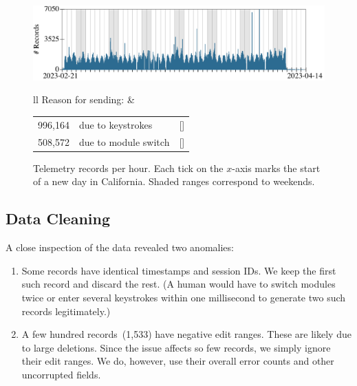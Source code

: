 \documentclass[english,submission,cleveref]{programming}
\begin{document}
\begin{figure}[t]\centering
  \includegraphics[width=\columnwidth]{img/row-distribution.pdf}
  \begin{tabular}{ll}
    Reason for sending:
    &
    \begin{tabular}[t]{r@{~~}l@{~~}r}
      996,164 & due to keystrokes  & [\pct{66.20}] \\
      508,572 & due to module switch & [\pct{33.80}]
    \end{tabular}
  \end{tabular}
  \caption{Telemetry records per hour. Each tick on the $x$-axis marks the start of a new day in California. Shaded ranges correspond to weekends.}
  \label{f:records-per-hour}
\end{figure}


\subsection{Data Cleaning}
\label{s:data-cleaning}

A close inspection of the data revealed two anomalies:
\begin{enumerate}
  \item
    Some records have identical timestamps and session IDs.
    We keep the first such record and discard the rest.
    (A human would have to switch modules twice or enter several keystrokes
     within one millisecond to generate two such records legitimately.)

   \item
     A few hundred records~(1,533) have negative edit ranges.
     These are likely due to large deletions.
     Since the issue affects so few records, we simply ignore
     their edit ranges. We do, however, use their overall error counts and other uncorrupted fields.

\end{enumerate}
\end{document}
